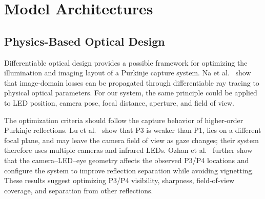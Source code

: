 \documentclass[sigconf,screen,review]{acmart}
\newcommand{\G}[1]{\cellcolor{GoodBG}#1}
\newcommand{\M}[1]{\cellcolor{MidBG}#1}
\newcommand{\R}[1]{\cellcolor{LowBG}#1}
\begin{document}
\section{Model Architectures}
\subsection{Physics-Based Optical Design}

Differentiable optical design provides a possible framework for optimizing the illumination and imaging layout of a Purkinje capture system. Na et al.~ show that image-domain losses can be propagated through differentiable ray tracing to physical optical parameters. For our system, the same principle could be applied to LED position, camera pose, focal distance, aperture, and field of view.

The optimization criteria should follow the capture behavior of higher-order Purkinje reflections. Lu et al.~ show that P3 is weaker than P1, lies on a different focal plane, and may leave the camera field of view as gaze changes; their system therefore uses multiple cameras and infrared LEDs. Ozhan et al.~ further show that the camera--LED--eye geometry affects the observed P3/P4 locations and configure the system to improve reflection separation while avoiding vignetting. These results suggest optimizing P3/P4 visibility, sharpness, field-of-view coverage, and separation from other reflections.
\end{document}
